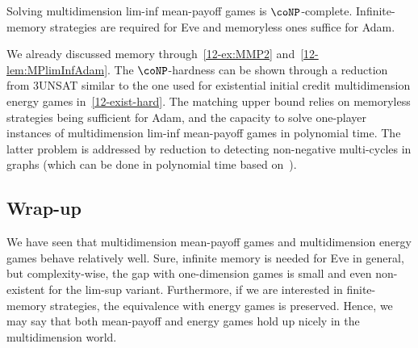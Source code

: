 \begin{theorem}
Solving multidimension lim-inf mean-payoff games is $\coNP$-complete. Infinite-memory strategies are required for Eve and memoryless ones suffice for Adam.
\end{theorem}

We already discussed memory through~\cref{12-ex:MMP2} and~\cref{12-lem:MPlimInfAdam}. The $\coNP$-hardness can be shown through a reduction from \textsf{3UNSAT} similar to the one used for existential initial credit multidimension energy games in~\cref{12-exist-hard}. The matching upper bound relies on memoryless strategies being sufficient for Adam, and the capacity to solve one-player instances of multidimension lim-inf mean-payoff games in polynomial time. The latter problem is addressed by reduction to detecting non-negative multi-cycles in graphs (which can be done in polynomial time based on~\cite{Kosaraju&Sullivan:1988}).

\subsection*{Wrap-up} 
We have seen that multidimension mean-payoff games and multidimension energy games behave relatively well. Sure, infinite memory is needed for Eve in general, but complexity-wise, the gap with one-dimension games is small and even non-existent for the lim-sup variant. Furthermore, if we are interested in finite-memory strategies, the equivalence with energy games is preserved. Hence, we may say that both mean-payoff and energy games hold up nicely in the multidimension world.
